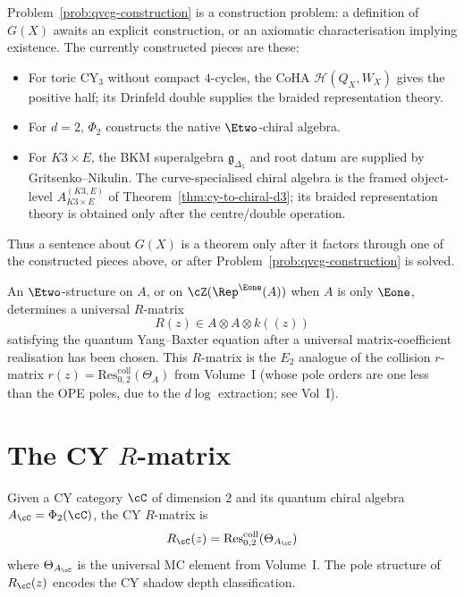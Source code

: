 \begin{remark}
\label{rem:qvcg-construction-locus}
Problem~\ref{prob:qvcg-construction} is a construction problem: a
definition of $G(X)$ awaits an explicit construction, or an axiomatic
characterisation implying existence. The currently constructed pieces
are these:
\begin{itemize}
 \item For toric CY$_3$ without compact $4$-cycles, the CoHA
 \(\mathcal H(Q_X,W_X)\) gives the positive half; its Drinfeld double
 supplies the braided representation theory.
 \item For \(d=2\), \(\Phi_2\) constructs the native \(\Etwo\)-chiral
 algebra.
 \item For \(K3\times E\), the BKM superalgebra
 \(\mathfrak g_{\Delta_5}\) and root datum are supplied by
 Gritsenko--Nikulin.  The curve-specialised chiral algebra is the
 framed object-level \(A_{K3\times E}^{(K3,E)}\) of
 Theorem~\ref{thm:cy-to-chiral-d3}; its braided representation theory
 is obtained only after the centre/double operation.
\end{itemize}
Thus a sentence about \(G(X)\) is a theorem only after it factors
through one of the constructed pieces above, or after
Problem~\ref{prob:qvcg-construction} is solved.
\end{remark}

An $\Etwo$-structure on \(A\), or on \(\cZ(\Rep^{\Eone}(A))\) when
\(A\) is only \(\Eone\), determines a universal $R$-matrix
\[
 R(z) \in A \otimes A \otimes k((z))
\]
satisfying the quantum Yang--Baxter equation after a universal
matrix-coefficient realisation has been chosen.
This $R$-matrix is the $E_2$ analogue of the collision $r$-matrix $r(z) = \mathrm{Res}^{\mathrm{coll}}_{0,2}(\Theta_A)$ from Volume~I (whose pole orders are one less than the OPE poles, due to the $d\log$ extraction; see Vol~I).

\section{The CY \texorpdfstring{$R$}{R}-matrix}
\label{sec:cy-r-matrix}

\begin{construction}
\label{constr:cy-r-matrix}
Given a CY category $\cC$ of dimension $2$ and its quantum chiral algebra $A_\cC = \Phi_2(\cC)$, the CY $R$-matrix is
\[
 R_\cC(z) = \mathrm{Res}^{\mathrm{coll}}_{0,2}(\Theta_{A_\cC})
\]
where $\Theta_{A_\cC}$ is the universal MC element from Volume~I. The pole structure of $R_\cC(z)$ encodes the CY shadow depth classification.
\end{construction}

